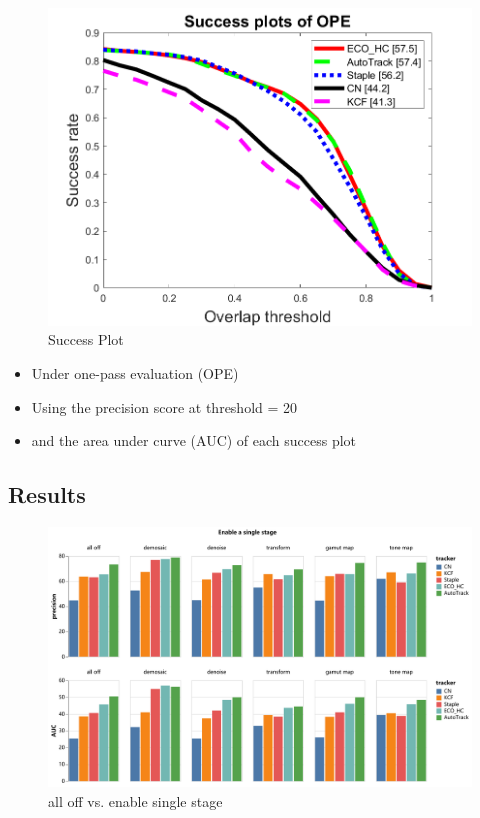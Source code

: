 \documentclass{beamer}
\begin{document}
\begin{frame}
    \begin{figure}[htpb]
        \begin{center}
            \includegraphics[width=0.8\linewidth]{fig/auc.png}
            \caption{Success Plot}
        \end{center}
    \end{figure}
\end{frame}

\begin{frame}
    \begin{itemize}[<+-| alert@+>]
        \item Under one-pass evaluation (OPE)
        \item Using the precision score at threshold = 20
        \item and the area under curve (AUC) of each success plot
    \end{itemize}
\end{frame}

\subsection{Results}

\begin{frame}
    \begin{figure}[htpb]
        \begin{center}
            \includegraphics[width=0.8\linewidth]{fig/en.pdf}
            \caption{all off vs. enable single stage}
        \end{center}
    \end{figure}
\end{frame}
\end{document}
